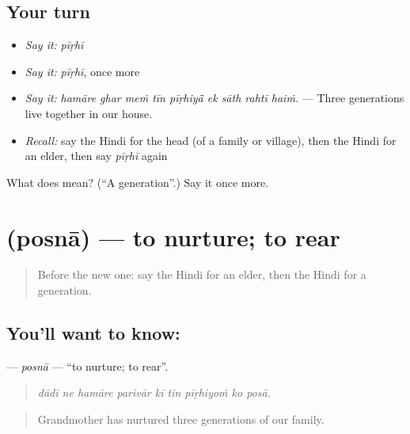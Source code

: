 \subsection*{Your turn}
\begin{itemize}
\raggedright
  \item \emph{Say it:} \emph{pīṛhī}
  \item \emph{Say it:} \emph{pīṛhī}, once more
  \item \emph{Say it:} \emph{hamāre ghar meṁ tīn pīṛhiyā̃ ek sāth rahtī haiṁ.} — Three generations live together in our house.
  \item \emph{Recall:} say the Hindi for the head (of a family or village), then the Hindi for an elder, then say \emph{pīṛhī} again
\end{itemize}

\begin{tcolorbox}[breakable,colback=teal!4,colframe=teal!35!black,title={Before you move on}]
What does  mean? (\textquotedblleft{}A generation\textquotedblright{}.) Say it once more.
\end{tcolorbox}
\section[\texorpdfstring{\hi{पोसना} (posnā)}{पोसना (posnā)}]{ (posnā) — to nurture; to rear}

\label{lesson:HI-C503-posna}



\begin{quote}
Before the new one: say the Hindi for an elder, then the Hindi for a generation.
\end{quote}

\subsection*{You'll want to know: }
\textbf{} — \emph{posnā} — \textquotedblleft{}to nurture; to rear\textquotedblright{}.

\begin{quote}
        
\end{quote}

\begin{quote}
\emph{dādī ne hamāre parivār kī tīn pīṛhiyoṁ ko posā.}
\end{quote}

\begin{quote}
Grandmother has nurtured three generations of our family.
\end{quote}

